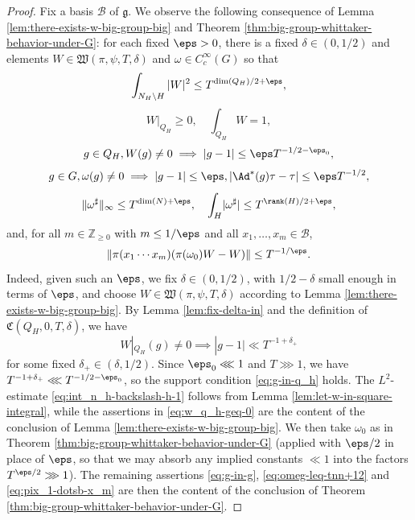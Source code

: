 \begin{proof}
  Fix a basis $\mathcal{B}$ of $\mathfrak{g}$.  We observe the following consequence of Lemma \ref{lem:there-exists-w-big-group-big} and Theorem \ref{thm:big-group-whittaker-behavior-under-G}: for each fixed $\eps > 0$, there is a fixed $\delta \in (0,1/2)$ and elements $W \in \mathfrak{W}(\pi,\psi,T,\delta)$ and $\omega \in C_c^\infty(G)$ so that
  \begin{equation}\label{eq:int_n_h-backslash-h-1}
    \int_{N_H \backslash H} |W|^2 \leq   T^{\dim(Q_H)/2 + \eps},
  \end{equation}
  \begin{equation}\label{eq:w_q_h-geq-0}
    W|_{Q_H} \geq 0, \quad \int_{Q_H} W =  1,
  \end{equation}
  \begin{equation}\label{eq:g-in-q_h}
    g \in Q_H, W(g) \neq 0 \implies |g - 1| \leq \eps T^{-1/2-\eps_0},
  \end{equation}
  \begin{equation}\label{eq:g-in-g}
    g \in G, \omega(g) \neq 0 \implies |g - 1| \leq \eps, |\Ad^*(g) \tau - \tau| \leq \eps T^{-1/2},
  \end{equation}
  \begin{equation}\label{eq:omeg-leq-tnn+12}
    \|\omega^{\sharp}\|_{\infty} \leq T^{\dim(N) + \eps}, \quad
    \int_H \lvert \omega^\sharp \rvert \leq T^{\rank(H)/2+\eps},
  \end{equation}
  and, for all $m \in \mathbb{Z}_{\geq 0}$ with $m \leq 1/\eps$ and all $x_1,\dotsc,x_m \in \mathcal{B}$,
  \begin{equation}\label{eq:pix_1-dotsb-x_m}
    \|\pi(x_1 \dotsb x_m) (\pi(\omega_0) W - W)\| \leq T^{-1/\eps}.
  \end{equation}
  Indeed, given such an $\eps$, we fix $\delta \in (0,1/2)$, with $1/2 - \delta$ small enough in terms of $\eps$, and choose $W \in \mathfrak{W}(\pi,\psi,T,\delta)$ according to Lemma \ref{lem:there-exists-w-big-group-big}.  By Lemma \ref{lem:fix-delta-in} and the definition of $\mathfrak{C}(Q_H,0,T,\delta)$, we have
  \begin{equation*}
    W|_{Q_H}(g) \neq 0 \implies |g - 1| \ll T^{-1+\delta_+}
  \end{equation*}
  for some fixed $\delta_+ \in (\delta,1/2)$.  Since $\eps_0 \lll 1$ and $T \ggg 1$, we have $T^{-1+\delta_+} \lll T^{-1/2-\eps_0}$, so the support condition \eqref{eq:g-in-q_h} holds.  The $L^2$-estimate \eqref{eq:int_n_h-backslash-h-1} follows from Lemma \ref{lem:let-w-in-square-integral}, while the assertions in \eqref{eq:w_q_h-geq-0} are the content of the conclusion of Lemma \ref{lem:there-exists-w-big-group-big}.  We then take $\omega_0$ as in Theorem \ref{thm:big-group-whittaker-behavior-under-G} (applied with $\eps/2$ in place of $\eps$, so that we may absorb any implied constants $\ll 1$ into the factors $T^{\eps/2} \ggg 1$).  The remaining assertions \eqref{eq:g-in-g}, \eqref{eq:omeg-leq-tnn+12} and \eqref{eq:pix_1-dotsb-x_m} are then the content of the conclusion of Theorem \ref{thm:big-group-whittaker-behavior-under-G}.


\end{proof}
